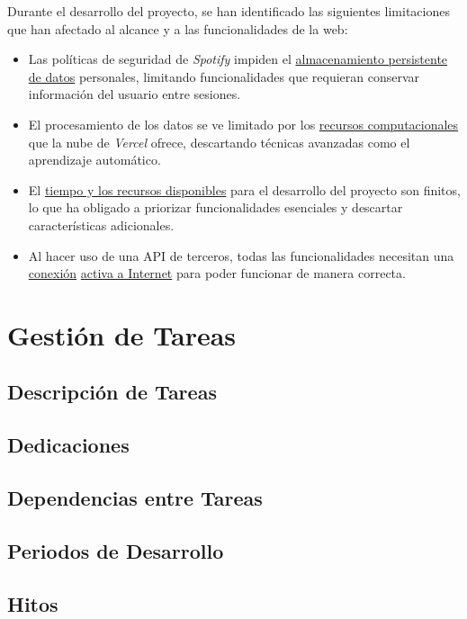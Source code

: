 Durante el desarrollo del proyecto, se han identificado las siguientes limitaciones que han afectado al alcance y a las funcionalidades de la web:

\begin{itemize}
    \item Las políticas de seguridad de \textit{Spotify} impiden el \underline{almacenamiento persistente de datos} personales, limitando funcionalidades que requieran conservar información del usuario entre sesiones.

    \item El procesamiento de los datos se ve limitado por los \underline{recursos computacionales} que la nube de \textit{Vercel} ofrece, descartando técnicas avanzadas como el aprendizaje automático.

    \item El \underline{tiempo y los recursos disponibles} para el desarrollo del proyecto son finitos, lo que ha obligado a priorizar funcionalidades esenciales y descartar características adicionales.

    \item Al hacer uso de una API de terceros, todas las funcionalidades necesitan una \underline{conexión} \underline{activa a Internet} para poder funcionar de manera correcta.
\end{itemize}

\section{Gestión de Tareas}
\subsection{Descripción de Tareas}
\subsection{Dedicaciones}
\subsection{Dependencias entre Tareas}
\subsection{Periodos de Desarrollo}
\subsection{Hitos}

